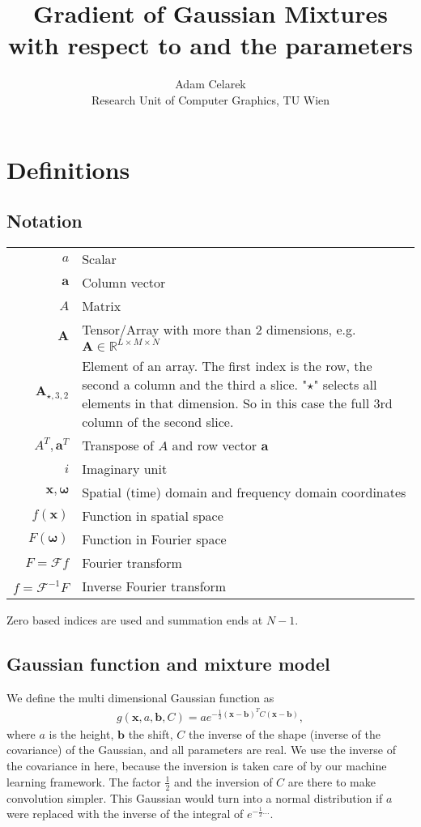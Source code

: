 \documentclass{paper}
\title{Gradient of Gaussian Mixtures with respect to \vr{x} and the parameters}
\author{Adam Celarek\\Research Unit of Computer Graphics, TU Wien}
\newcommand{\F}{\ensuremath{\mathcal{F}}}
\newcommand{\vr}[1]{\ensuremath{\boldsymbol{#1}}}
\newcommand{\mx}[1]{\ensuremath{#1}}
\newcommand{\tr}[1]{\ensuremath{\boldsymbol{#1}}}
\begin{document}
\maketitle

\section{Definitions}
\subsection*{Notation}
\begin{center}
	\begin{supertabular}{rp{8cm}}
		$a$	& Scalar \\
		$\vr{a}$	& Column vector \\
		$\mx{A}$			& Matrix \\ 
		$\tr{A}$	& Tensor/Array with more than 2 dimensions, e.g. $\tr{A} \in \mathbb{R}^{L \times M \times N}$ \\ 
		$\tr{A}_{\star, 3, 2}$
					& Element of an array.
					The first index is the row, the second a column and the third a slice.
					"$\star$" selects all elements in that dimension.
					So in this case the full 3rd column of the second slice. \\ 
		$A^T, \vr{a}^T$
					& Transpose of $A$ and row vector $\vr{a}$ \\
		$i$			& Imaginary unit \\
		$\vr{x}, \vr{\omega}$
					& Spatial (time) domain and frequency domain coordinates \\
		$f(\vr{x})$
					& Function in spatial space \\
		$F(\vr{\omega})$
					& Function in Fourier space \\
		$F = \F f$
					& Fourier transform \\
		$f = \F^{-1} F$
					& Inverse Fourier transform \\
	\end{supertabular}
\end{center}
Zero based indices are used and summation ends at $N-1$.

\subsection*{Gaussian function and mixture model}
We define the multi dimensional Gaussian function as
\begin{align}
\label{eq:gaussian_definition}
g(\vr{x}, a, \vr{b}, C) = a e^{-\frac{1}{2}(\vr{x}-\vr{b})^TC(\vr{x}-\vr{b})},
\end{align}
where $a$ is the height, $\vr{b}$ the shift, $C$ the inverse of the shape (inverse of the covariance) of the Gaussian, and all parameters are real.
We use the inverse of the covariance in here, because the inversion is taken care of by our machine learning framework.
The factor $\frac{1}{2}$ and the inversion of $C$ are there to make convolution simpler.
This Gaussian would turn into a normal distribution if $a$ were replaced with the inverse of the integral of $e^{-\frac{1}{2}...}$.
\end{document}
